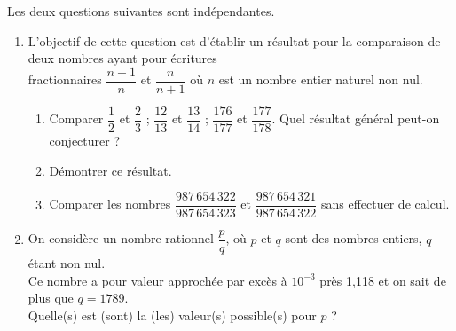 \bigskip


\begin{exercice}[CRPE 2015 G3] %
   Les deux questions suivantes sont indépendantes.
   \begin{enumerate}
      \item L'objectif de cette question est d'établir un résultat pour la comparaison de deux nombres ayant pour écritures \\ [1mm]
         fractionnaires $\dfrac{n-1}{n}$ et $\dfrac{n}{n+1}$ où $n$ est un nombre entier naturel non nul. \smallskip
      \begin{enumerate}
         \item Comparer $\dfrac12$ et $\dfrac23$ ; $\dfrac{12}{13}$ et $\dfrac{13}{14}$ ; $\dfrac{176}{177}$ et $\dfrac{177}{178}$. Quel résultat général peut-on conjecturer ? \smallskip
         \item Démontrer ce résultat. \smallskip
         \item Comparer les nombres $\dfrac{987\,654\,322}{987\,654\,323}$ et $\dfrac{987\,654\,321}{987\,654\,322}$ sans effectuer de calcul. \smallskip
      \end{enumerate}
      \item On considère un nombre rationnel $\dfrac{p}{q}$, où $p$ et $q$ sont des nombres entiers, $q$ étant non nul. \\
         Ce nombre a pour valeur approchée par excès à $10^{-3}$ près 1,118 et on sait de plus que $q =1789$. \\
         Quelle(s) est (sont) la (les) valeur(s) possible(s) pour $p$ ?
   \end{enumerate}
\end{exercice}

